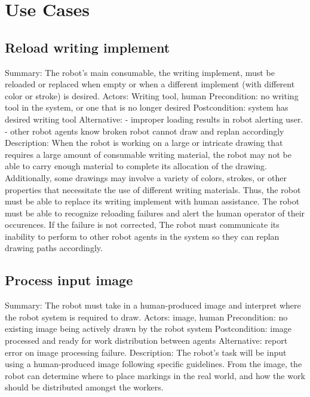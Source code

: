
\section{Use Cases}
\label{sec:use_cases}

\subsection{Reload writing implement}
Summary: The robot's main consumable, the writing implement, must be reloaded or replaced when empty or when a different implement (with different color or stroke) is desired.
Actors:  Writing tool, human
Precondition: no writing tool in the system, or one that is no longer desired
Postcondition: system has desired writing tool
Alternative: - improper loading results in robot alerting user.
             - other robot agents know broken robot cannot draw and replan accordingly
Description: When the robot is working on a large or intricate drawing that requires a large amount of consumable writing material, the robot may not be able to carry enough material to complete its allocation of the drawing. Additionally, some drawings may involve a variety of colors, strokes, or other properties that necessitate the use of different writing materials. Thus, the robot must be able to replace its writing implement with human assistance. The robot must be able to recognize reloading failures and alert the human operator of their occurences. If the failure is not corrected, The robot must communicate its inability to perform to other robot agents in the system so they can replan drawing paths accordingly.

\subsection{Process input image}
Summary: The robot must take in a human-produced image and interpret where the robot system is required to draw.
Actors: image, human
Precondition:  no existing image being actively drawn by the robot system
Postcondition: image processed and ready for work distribution between agents
Alternative: report error on image processing failure.
Description: The robot's task will be input using a human-produced image following specific guidelines. From the image, the robot can determine where to place markings in the real world, and how the work should be distributed amongst the workers.

